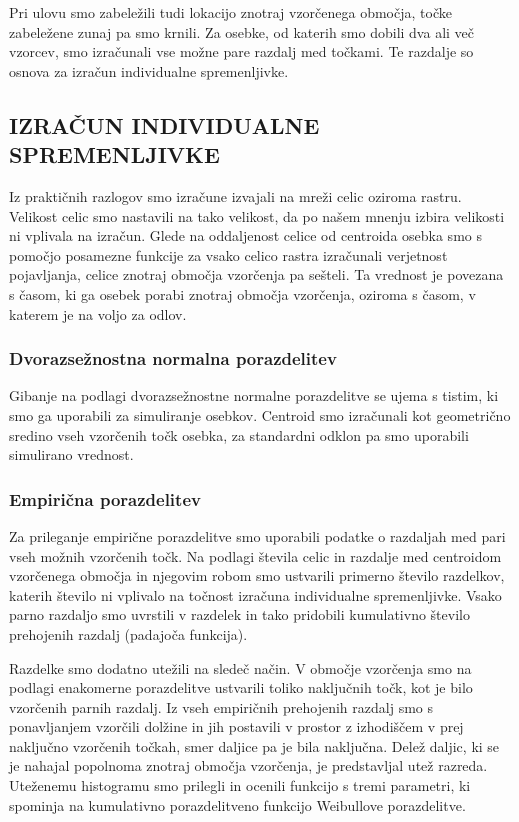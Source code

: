 Pri ulovu smo zabeležili tudi lokacijo znotraj vzorčenega območja, točke zabeležene zunaj pa smo krnili. Za osebke, od katerih smo dobili dva ali več vzorcev, smo izračunali vse možne pare razdalj med točkami. Te razdalje so osnova za izračun individualne spremenljivke.

\subsection{IZRAČUN INDIVIDUALNE SPREMENLJIVKE}
Iz praktičnih razlogov smo izračune izvajali na mreži celic oziroma rastru. Velikost celic smo nastavili na tako velikost, da po našem mnenju izbira velikosti ni vplivala na izračun. Glede na oddaljenost celice od centroida osebka smo s pomočjo posamezne funkcije za vsako celico rastra izračunali verjetnost pojavljanja, celice znotraj območja vzorčenja pa sešteli. Ta vrednost je povezana s časom, ki ga osebek porabi znotraj območja vzorčenja, oziroma s časom, v katerem je na voljo za odlov.

\subsubsection[\bfseries Dvorazsežnostna normalna porazdelitev]{Dvorazsežnostna normalna porazdelitev}
Gibanje na podlagi dvorazsežnostne normalne porazdelitve se ujema s tistim, ki smo ga uporabili za simuliranje osebkov. Centroid smo izračunali kot geometrično sredino vseh vzorčenih točk osebka, za standardni odklon pa smo uporabili simulirano vrednost.

\subsubsection[\bfseries Empirična porazdelitev]{Empirična porazdelitev}
Za prileganje empirične porazdelitve smo uporabili podatke o razdaljah med pari vseh možnih vzorčenih točk. Na podlagi števila celic in razdalje med centroidom vzorčenega območja in njegovim robom smo ustvarili primerno število razdelkov, katerih število ni vplivalo na točnost izračuna individualne spremenljivke. Vsako parno razdaljo smo uvrstili v razdelek in tako pridobili kumulativno število prehojenih razdalj (padajoča funkcija).

Razdelke smo dodatno utežili na sledeč način. V območje vzorčenja smo na podlagi enakomerne porazdelitve ustvarili toliko naključnih točk, kot je bilo vzorčenih parnih razdalj. Iz vseh empiričnih prehojenih razdalj smo s ponavljanjem vzorčili dolžine in jih postavili v prostor z izhodiščem v prej naključno vzorčenih točkah, smer daljice pa je bila naključna. Delež daljic, ki se je nahajal popolnoma znotraj območja vzorčenja, je predstavljal utež razreda. Uteženemu histogramu smo prilegli in ocenili funkcijo s tremi parametri, ki spominja na kumulativno porazdelitveno funkcijo Weibullove porazdelitve.

